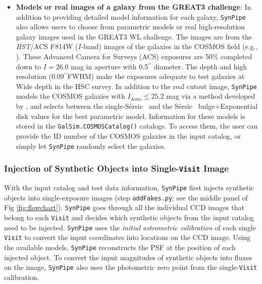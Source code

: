 \documentclass[useamsfonts]{pasj01}
\def\asec{$^{\prime\prime}$}
\def\ser{{S\'{e}rsic\ }}
\def\synpipe{\texttt{SynPipe}}
\def\visit{\texttt{Visit}}
\def\hst{{\textit{HST}}}
\begin{document}
\begin{itemize}
        \item \textbf{Models or real images of a galaxy from the GREAT3 challenge}:
            In addition to providing detailed model information for each galaxy, \synpipe{}
            also allows users to choose from parametric models or real
            high-resolution galaxy images used in the GREAT3 WL challenge.
            The  images are from the \hst{}/ACS F814W ($I$-band) images of the galaxies
            in the COSMOS field (e.g., \citealt{Scoville2007}).
            These Advanced Camera for Surveys (ACS) exposures are 50\% completed down to $I=26.0$ mag in aperture with
            0.5\asec{} diameter.
            The depth and high resolution (0.09\asec FWHM) make the exposures adequate to test
            galaxies at Wide depth in the HSC survey.
            In addition to the real cutout image, \synpipe{} models the COSMOS galaxies with
            $I_{\mathrm{Auto}}\leq25.2$ mag via a method developed by
            \citet{Lackner2012}, and selects between the single-\ser{} and the \ser{} bulge$+$Exponential disk
            values for the best parametric model.
            Information for these models is stored in the
            \texttt{GalSim.COSMOSCatalog()} catalogs.
            To access them, the user can provide the ID number of the COSMOS galaxies in the
            input catalog, or simply let \synpipe{} randomly select the galaxies.

    \end{itemize}

\subsubsection{Injection of Synthetic Objects into Single-\visit{} Image}
    \label{sssec:addFakes}

    With the input catalog and test data information, \synpipe{} first
    injects synthetic objects into single-exposure images (step \texttt{addFakes.py};
    see the middle panel of Fig \ref{fig:flowchart}).
     \synpipe{} goes through all the individual CCD images
    that belong to each \visit{} and decides which synthetic objects from the input catalog need
    to be injected.
    \synpipe{} uses the \textit{initial astrometric calibration} of each single
    \visit{} to convert the input coordinates into locations on the CCD image.
    Using the available models, \synpipe{} reconstructs the PSF at the position of
    each injected object.
    To convert the input magnitudes of synthetic objects into fluxes on the image,
    \synpipe{} also uses the photometric zero point from the single-\visit{}
    calibration.
\end{document}
